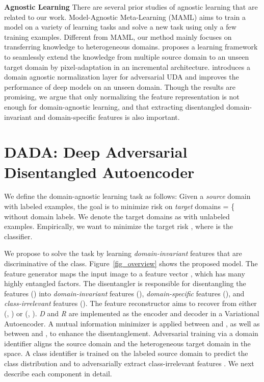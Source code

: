 \documentclass{article}
\begin{document}
\textbf{Agnostic Learning} There are several prior studies of agnostic learning that are 
related to our work. Model-Agnostic Meta-Learning (MAML) \cite{maml} aims to train a model on a variety of learning tasks and solve a new task using only a few training examples. Different from MAML, our method mainly focuses on transferring knowledge to heterogeneous domains. \citet{agnostic_dg_2018} proposes a learning framework to seamlessly extend the knowledge from multiple source domain to an unseen target domain by pixel-adaptation in an incremental architecture. \citet{domain_agnostic_norm18} introduces a domain agnostic normalization layer for  adversarial UDA and improves the performance of deep models on an unseen domain. Though the results are promising, we argue that only normalizing the feature representation is not enough for domain-agnostic learning, and that extracting disentangled domain-invariant and domain-specific features is also important.  \section{DADA: Deep Adversarial Disentangled Autoencoder}
\label{dada}



We define the domain-agnostic learning task as follows: Given a \emph{source} domain  with  labeled examples, the goal is to minimize risk on  \emph{target} domains  = \{ without domain labels. We denote the target domains as  with  unlabeled examples. 
Empirically, we want to minimize the target risk , where  is the classifier.


We propose to solve the task by learning \textit{domain-invariant} features that are discriminative of the class.
Figure~\ref{fig_overview} shows the proposed model. The feature generator  maps the input image to a feature vector , which has many highly entangled factors. The disentangler  is responsible for disentangling the features () 
into \textit{domain-invariant} features (), \textit{domain-specific} features (), and \textit{class-irrelevant} features (). The feature reconstructor  aims to recover  from either (, ) or (, ).
\textit{D} and \textit{R} are implemented as the encoder and decoder in a Variational Autoencoder. A mutual information minimizer is applied between  and , as well as between  and , to enhance the disentanglement. Adversarial training via a domain identifier aligns the source domain and the heterogeneous target domain in the  space. A class identifier  is trained on the labeled source domain 
to predict the class distribution  and to adversarially extract class-irrelevant features . We next describe each component in detail.
\end{document}
